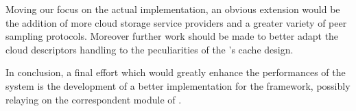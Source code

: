 Moving our focus on the actual implementation, an obvious extension
would be the addition of more cloud storage service
providers and a greater variety of peer sampling protocols. Moreover
further work should be made to better adapt the
cloud descriptors handling to the peculiarities of the \grapes's
cache design.

In conclusion, a final effort which would greatly enhance
the performances of the system is the development of a better \networkhelper
implementation for the \cloudypeer framework, possibly relaying on the
correspondent module of \grapes.
